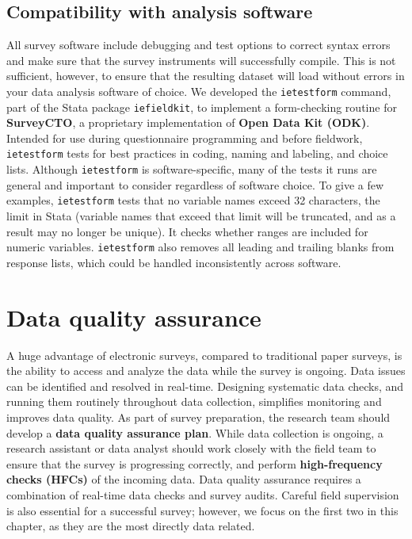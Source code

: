 \subsection{Compatibility with analysis software}
All survey software include debugging and test options to correct syntax errors and make sure that the survey instruments will successfully compile.
This is not sufficient, however, to ensure that the resulting dataset will load without errors in your data analysis software of choice.
We developed the \texttt{ietestform}
command, part of
the Stata package
\texttt{iefieldkit}, to implement a form-checking routine for \textbf{SurveyCTO}, a proprietary implementation of \textbf{Open Data Kit (ODK)}.
Intended for use during questionnaire programming and before fieldwork,
\texttt{ietestform} tests for best practices in coding, naming and labeling,
and choice lists.
Although \texttt{ietestform} is software-specific, many of the tests it runs are general and important to consider regardless of software choice.
To give a few examples, \texttt{ietestform} tests that no variable names exceed
32 characters, the limit in Stata (variable names that exceed that limit will
be truncated, and as a result may no longer be unique). It checks whether
ranges are included for numeric variables.
\texttt{ietestform} also removes all leading and trailing blanks from response lists, which could be handled inconsistently across software.


\section{Data quality assurance}
A huge advantage of electronic surveys, compared to traditional paper surveys, is the ability to access and analyze the data while the survey is ongoing.
Data issues can be identified and resolved in real-time. Designing systematic data checks, and running them routinely throughout data collection, simplifies monitoring and improves data quality.
As part of survey preparation, the research team should develop a \textbf{data quality assurance plan}.
While data collection is ongoing, a research assistant or data analyst should work closely with the field team to ensure that the survey is progressing correctly, and perform \textbf{high-frequency checks (HFCs)} of the incoming data.
Data quality assurance requires a combination of real-time data checks and survey audits. Careful field supervision is also essential for a successful survey; however, we focus on the first two in this chapter, as they are the most directly data related.


